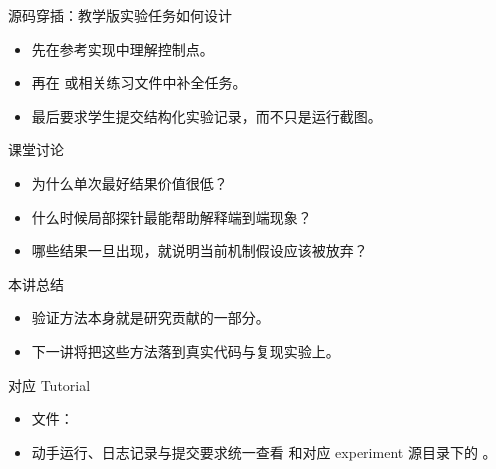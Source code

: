 \begin{frame}{源码穿插：教学版实验任务如何设计}
  \begin{itemize}
    \item 先在参考实现中理解控制点。
    \item 再在 \texttt{} 或相关练习文件中补全任务。
    \item 最后要求学生提交结构化实验记录，而不只是运行截图。
  \end{itemize}
\end{frame}



\begin{frame}{课堂讨论}
  \begin{itemize}
    \item 为什么单次最好结果价值很低？
    \item 什么时候局部探针最能帮助解释端到端现象？
    \item 哪些结果一旦出现，就说明当前机制假设应该被放弃？
  \end{itemize}
\end{frame}

\begin{frame}{本讲总结}
  \begin{itemize}
    \item 验证方法本身就是研究贡献的一部分。
    \item 下一讲将把这些方法落到真实代码与复现实验上。
  \end{itemize}
\end{frame}

\begin{frame}{对应 Tutorial}
  \begin{itemize}
    \item 文件：\texttt{}
    \item 动手运行、日志记录与提交要求统一查看 \texttt{} 和对应 experiment 源目录下的 \texttt{}。
  \end{itemize}
\end{frame}

